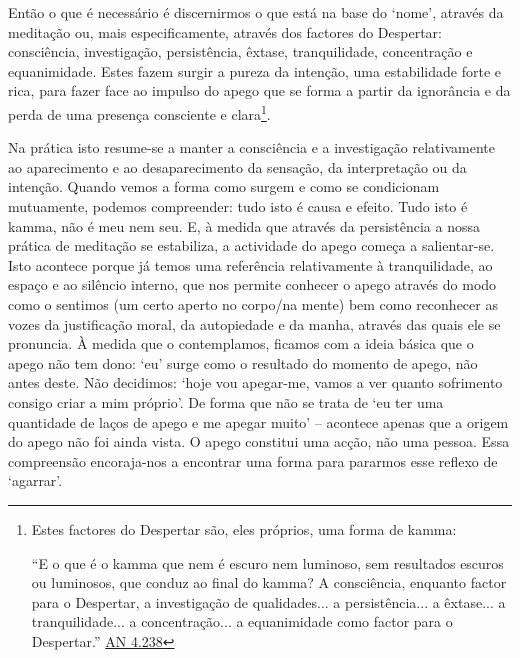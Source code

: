 Então o que é necessário é discernirmos o que está na base do `nome', através da meditação ou, mais especificamente, através dos factores do Despertar: consciência, investigação, persistência, êxtase, tranquilidade, concentração e equanimidade. Estes fazem surgir a pureza da intenção, uma estabilidade forte e rica, para fazer face ao impulso do apego que se forma a partir da ignorância e da perda de uma presença consciente e clara\footnote{Estes factores do Despertar são, eles próprios, uma forma de kamma:

  ``E o que é o kamma que nem é escuro nem luminoso, sem resultados escuros ou luminosos, que conduz ao final do kamma? A consciência, enquanto factor para o Despertar, a investigação de qualidades... a persistência... a êxtase... a tranquilidade... a concentração... a equanimidade como factor para o Despertar.'' \href{https://suttacentral.net/an4.238/en/sujato}{AN 4.238}}.

Na prática isto resume-se a manter a consciência e a investigação relativamente ao aparecimento e ao desaparecimento da sensação, da interpretação ou da intenção. Quando vemos a forma como surgem e como se condicionam mutuamente, podemos compreender: tudo isto é causa e efeito. Tudo isto é kamma, não é meu nem seu. E, à medida que através da persistência a nossa prática de meditação se estabiliza, a actividade do apego começa a salientar-se. Isto acontece porque já temos uma referência relativamente à tranquilidade, ao espaço e ao silêncio interno, que nos permite conhecer o apego através do modo como o sentimos (um certo aperto no corpo/na mente) bem como reconhecer as vozes da justificação moral, da autopiedade e da manha, através das quais ele se pronuncia. À medida que o contemplamos, ficamos com a ideia básica que o apego não tem dono: `eu' surge como o resultado do momento de apego, não antes deste. Não decidimos: `hoje vou apegar-me, vamos a ver quanto sofrimento consigo criar a mim próprio'. De forma que não se trata de `eu ter uma quantidade de laços de apego e me apegar muito' -- acontece apenas que a origem do apego não foi ainda vista. O apego constitui uma acção, não uma pessoa. Essa compreensão encoraja-nos a encontrar uma forma para pararmos esse reflexo de `agarrar'.

